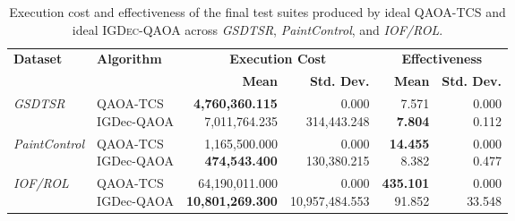 
\begin{table}[ht]
\centering
\caption{Execution cost and effectiveness of the final test suites produced by ideal \textsc{QAOA-TCS} and ideal \textsc{IGDec-QAOA} across \textit{GSDTSR}, \textit{PaintControl}, and \textit{IOF/ROL}.}
\label{tab:all_datasets_metrics_nobackend}
\scriptsize
\begin{tabular}{llrrrr}
\toprule
\textbf{Dataset} & \textbf{Algorithm} &
\multicolumn{2}{c}{\textbf{Execution Cost}} &
\multicolumn{2}{c}{\textbf{Effectiveness}} \\
\cmidrule(lr){3-4}\cmidrule(lr){5-6}
 & & \textbf{Mean} & \textbf{Std. Dev.} & \textbf{Mean} & \textbf{Std. Dev.} \\
\midrule

\textit{GSDTSR} &
\shortstack[l]{QAOA-TCS\\IGDec-QAOA} &
\shortstack[r]{\textbf{4,760,360.115}\\7,011,764.235} &
\shortstack[r]{0.000\\314,443.248} &
\shortstack[r]{7.571\\\textbf{7.804}} &
\shortstack[r]{0.000\\0.112} \\[4pt]

\textit{PaintControl} &
\shortstack[l]{QAOA-TCS\\IGDec-QAOA} &
\shortstack[r]{1,165,500.000\\\textbf{474,543.400}} &
\shortstack[r]{0.000\\130,380.215} &
\shortstack[r]{\textbf{14.455}\\8.382} &
\shortstack[r]{0.000\\0.477} \\[4pt]

\textit{IOF/ROL} &
\shortstack[l]{QAOA-TCS\\IGDec-QAOA} &
\shortstack[r]{64,190,011.000\\\textbf{10,801,269.300}} &
\shortstack[r]{0.000\\10,957,484.553} &
\shortstack[r]{\textbf{435.101}\\91.852} &
\shortstack[r]{0.000\\33.548} \\
\bottomrule
\end{tabular}
\end{table}

